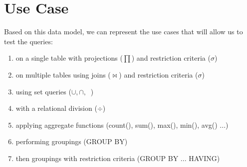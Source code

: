 \section{Use Case}
Based on this data model, we can represent the use cases that will allow us to test the queries:
    \begin{enumerate}
    \item on a single table with projections ($\prod$) and restriction criteria ($\sigma$)
    \item on multiple tables using joins ($\bowtie$) and restriction criteria ($\sigma$)
    \item using set queries ($\cup, \cap, \ $ )
    \item with a relational division ($\div$)
    \item applying aggregate functions (count(), sum(), max(), min(), avg() ...)
    \item performing groupings (GROUP BY)
    \item then groupings with restriction criteria (GROUP BY ... HAVING)
    \end{enumerate}


